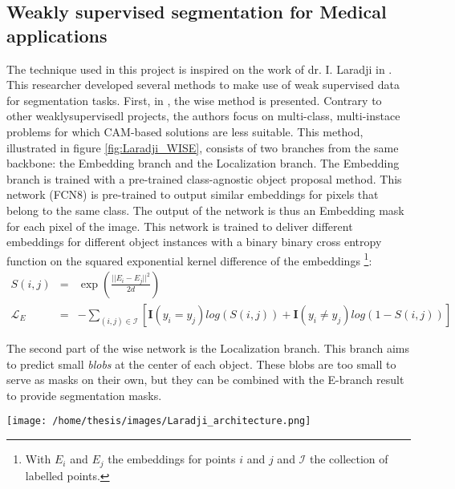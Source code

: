 \subsection{Weakly supervised segmentation for Medical applications}
\par{
    The technique used in this project is inspired on the work of dr. I. Laradji in \cite{Laradji2020}.
    This researcher developed several methods to make use of weak supervised data for segmentation tasks.
    First, in \cite{Laradji2018}, the \Gls{wise} method is presented. 
    Contrary to other \Gls{weaklysupervisedl} projects, the authors focus on multi-class, multi-instace problems for which CAM-based solutions are less suitable.
    This method, illustrated in figure \ref{fig:Laradji_WISE}, consists of two branches from the same backbone: the Embedding branch and the Localization branch.
    The Embedding branch is trained with a pre-trained class-agnostic object proposal method. 
    This network (FCN8) is pre-trained to output similar embeddings for pixels that belong to the same class.
    The output of the network is thus an Embedding mask for each pixel of the image. 
    This network is trained to deliver different embeddings for different object instances with a binary binary cross entropy function on the squared exponential kernel difference of the embeddings
    \footnote{With $E_i$ and $E_j$ the embeddings for points $i$ and $j$ and $\mathcal{I}$ the collection of labelled points.}:
}
\begin{eqnarray}
    S(i,j) &=& \exp \left( \frac{||E_i-E_j||^2}{2d} \right)\\
    \mathcal{L}_E &=& - \sum_{(i,j)\in \mathcal{I}} \left[  \mathbf{I}(y_i=y_j) log(S(i,j)) + \mathbf{I}(y_i\neq y_j) log(1-S(i,j))  \right]
\end{eqnarray}
\par{
    The second part of the \Gls{wise} network is the Localization branch. 
    This branch aims to predict small \textit{blobs} at the center of each object.
    These blobs are too small to serve as masks on their own, but they can be combined with the E-branch result to provide segmentation masks.
}
\begin{SCfigure}[][htb]
    \texttt{[image: /home/thesis/images/Laradji\_architecture.png]}
    \caption{Illustration from \cite{Laradji2020}. The \Gls{wise} approach consists of two branches: The Embedding branch and the Localization branch.}
    \label{fig:Laradji_WISE}
\end{SCfigure}
